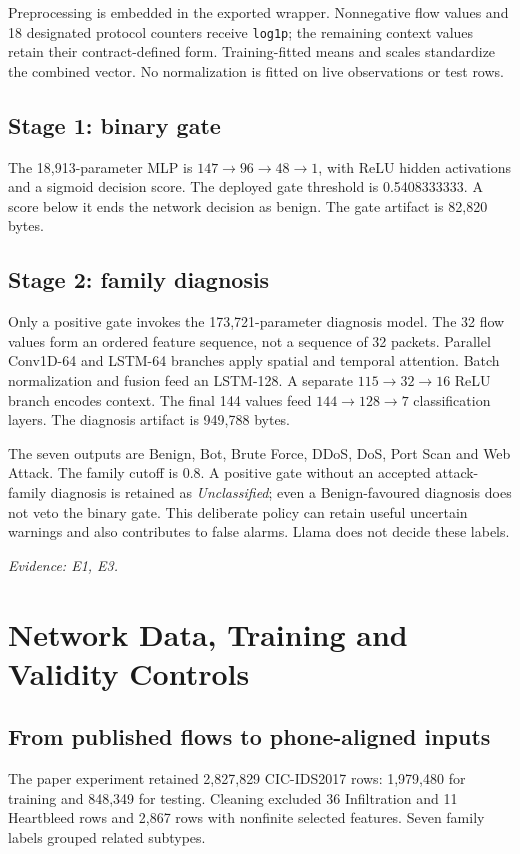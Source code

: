 \documentclass[11pt,a4paper]{article}
\newcommand{\source}[1]{{\small\textit{Evidence: #1.}\par}}
\newcommand{\chapterpage}[1]{\clearpage\section{#1}}
\begin{document}
Preprocessing is embedded in the exported wrapper. Nonnegative flow values and
18 designated protocol counters receive \texttt{log1p}; the remaining context values
retain their contract-defined form. Training-fitted means and scales standardize the
combined vector. No normalization is fitted on live observations or test rows.

\subsection*{Stage 1: binary gate}
The 18,913-parameter MLP is
$147\rightarrow96\rightarrow48\rightarrow1$, with ReLU hidden activations and a
sigmoid decision score. The deployed gate threshold is 0.5408333333.
A score below it ends the network decision as benign. The gate artifact is 82,820 bytes.

\subsection*{Stage 2: family diagnosis}
Only a positive gate invokes the 173,721-parameter diagnosis model. The 32 flow values
form an ordered feature sequence, not a sequence of 32 packets. Parallel Conv1D-64 and
LSTM-64 branches apply spatial and temporal attention. Batch normalization and fusion
feed an LSTM-128. A separate $115\rightarrow32\rightarrow16$ ReLU branch encodes context.
The final 144 values feed $144\rightarrow128\rightarrow7$ classification layers.
The diagnosis artifact is 949,788 bytes.

The seven outputs are Benign, Bot, Brute Force, DDoS, DoS, Port Scan and Web Attack.
The family cutoff is 0.8. A positive gate without an accepted attack-family diagnosis
is retained as \textit{Unclassified}; even a Benign-favoured diagnosis does not veto
the binary gate. This deliberate policy can retain useful uncertain warnings and
also contributes to false alarms. Llama does not decide these labels.
\source{E1, E3}

\chapterpage{Network Data, Training and Validity Controls}
\subsection*{From published flows to phone-aligned inputs}
The paper experiment retained 2,827,829 CIC-IDS2017 rows: 1,979,480 for training and
848,349 for testing. Cleaning excluded 36 Infiltration and 11 Heartbleed rows and
2,867 rows with nonfinite selected features. Seven family labels grouped related subtypes.
\end{document}
